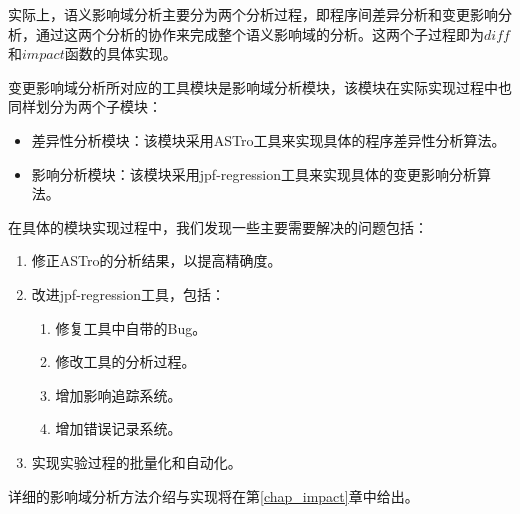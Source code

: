 实际上，语义影响域分析主要分为两个分析过程，即程序间差异分析和变更影响分析，通过这两个分析的协作来完成整个语义影响域的分析。这两个子过程即为$diff$和$impact$函数的具体实现。

变更影响域分析所对应的工具模块是影响域分析模块，该模块在实际实现过程中也同样划分为两个子模块：
\begin{itemize}
	\item 差异性分析模块：该模块采用ASTro工具来实现具体的程序差异性分析算法。
	\item 影响分析模块：该模块采用jpf-regression工具来实现具体的变更影响分析算法。
\end{itemize}

在具体的模块实现过程中，我们发现一些主要需要解决的问题包括：
\begin{enumerate}
	\item 修正ASTro的分析结果，以提高精确度。
	\item 改进jpf-regression工具，包括：
	\begin{enumerate}
		\item 修复工具中自带的Bug。
		\item 修改工具的分析过程。
		\item 增加影响追踪系统。
		\item 增加错误记录系统。
	\end{enumerate}
	
	\item 实现实验过程的批量化和自动化。
\end{enumerate}

详细的影响域分析方法介绍与实现将在第\ref {chap_impact}章中给出。

